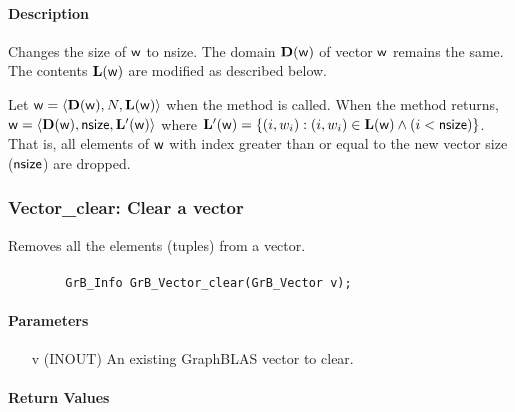 \paragraph{Description}

Changes the size of ${\sf w}$ to {\sf nsize}. The domain
$\mathbf{D}({\sf w})$ of vector ${\sf w}$ remains the same. The
contents $\mathbf{L}({\sf w})$ are modified as described below.

Let ${\sf w} = \langle \mathbf{D}({\sf w}), N, \mathbf{L}({\sf w})
\rangle$ when the method is called. When the method returns, ${\sf w}
= \langle \mathbf{D}({\sf w}), {\sf nsize}, \mathbf{L'}({\sf w})
\rangle$ where $\mathbf{L'}({\sf w}) = \{(i,w_i) : (i,w_i) \in
\mathbf{L}({\sf w}) \wedge (i < {\sf nsize})\}$. That is, all elements
of ${\sf w}$ with index greater than or equal to the new vector size
(${\sf nsize}$) are dropped.


\subsubsection{{\sf Vector\_clear}: Clear a vector}

Removes all the elements (tuples) from a vector.

\paragraph{\syntax}

\begin{verbatim}
        GrB_Info GrB_Vector_clear(GrB_Vector v);
\end{verbatim}

\paragraph{Parameters}

\begin{itemize}[leftmargin=1.1in]
    \item[{\sf v}] ({\sf INOUT}) An existing GraphBLAS vector to clear.
\end{itemize}

\paragraph{Return Values}

